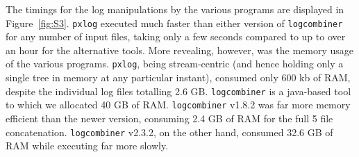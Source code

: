 \documentclass{article}
\begin{document}
The timings for the log manipulations by the various programs are displayed in Figure~\ref{fig:S3}. \texttt{pxlog} executed much faster than either version of \texttt{logcombiner} for any number of input files, taking only a few seconds compared to up to over an hour for the alternative tools. More revealing, however, was the memory usage of the various programs. \texttt{pxlog}, being stream-centric (and hence holding only a single tree in memory at any particular instant), consumed only 600 kb of RAM, despite the individual log files totalling 2.6 GB. \texttt{logcombiner} is a java-based tool to which we allocated 40 GB of RAM. \texttt{logcombiner} v1.8.2 was far more memory efficient than the newer version, consuming 2.4 GB of RAM for the full 5 file concatenation. \texttt{logcombiner} v2.3.2, on the other hand, consumed 32.6 GB of RAM while executing far more slowly.

%
%
%
%
%
%
%

\end{document}
